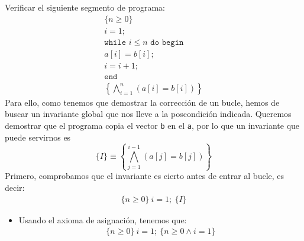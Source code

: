 \begin{ejercicio}
    Verificar el siguiente segmento de programa:
    \begin{gather*}
        \{n\geq 0\}\\ 
        i = 1;\\
        \texttt{while\ } i\leq n \texttt{\ do\ begin}\\
        a[i] = b[i]; \\
        i=i+1;\\
        \texttt{end} \\
        \left\{\bigwedge_{i=1}^n (a[i]=b[i])\right\}
    \end{gather*}
    Para ello, como tenemos que demostrar la corrección de un bucle, hemos de buscar un invariante global que nos lleve a la poscondición indicada. Queremos demostrar que el programa copia el vector \verb|b| en el \verb|a|, por lo que un invariante que puede servirnos es
    \begin{equation*}
        \{I\} \equiv \left\{\bigwedge_{j=1}^{i-1}(a[j] = b[j])\right\}
    \end{equation*}
    Primero, comprobamos que el invariante es cierto antes de entrar al bucle, es decir:
    \begin{gather*}
        \{n\geq 0\}\ i = 1;\ \{I\}
    \end{gather*}
    \begin{itemize}
        \item Usando el axioma de asignación, tenemos que:
            \begin{gather*}
                \{n\geq 0\}\ i = 1;\ \{n\geq 0 \land i = 1\}
            \end{gather*}


\end{itemize}
\end{ejercicio}
